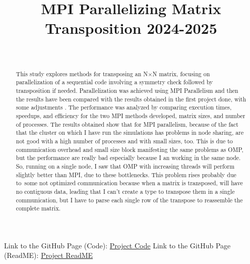 \documentclass[conference]{IEEEtran}
\begin{document}
\title{MPI Parallelizing Matrix Transposition 2024-2025}

\author{
    \\[-5.5ex]
}
\maketitle
\begin{abstract}
This study explores methods for transposing an N$\times$N matrix, focusing on parallelization of a sequential code involving a symmetry check followed by transposition if needed.
Parallelization was achieved using MPI Parallelism and then the results have been compared with the results obtained in the first project done, with some adjustments \cite{my_first_report}.
The performance was analyzed by comparing execution times, speedups, and efficiency for the two MPI methods developed, matrix sizes, and number of processes.
The results obtained show that for MPI parallelism, because of the fact that the cluster on which I have run the simulations has problems in node sharing, are not good with a high number of processes and with small sizes, too.
This is due to communication overhead and small size block manifesting the same problems as OMP, but the performance are really bad especially because I an working in the same node. So, running on a single node, I saw that OMP with increasing threads will perform slightly better than MPI, due to these bottlenecks.
This problem rises probably due to\ some not optimized communication because when a matrix is transposed, will have no contiguous data, leading that I can't create a type to transpose them in a single communication, but I have to parse each single row of the transpose to reassemble the complete matrix.
\end{abstract}


\newpage
\printbibliography 
Link to the GitHub Page (Code):
\href{https://github.com/Gotta003/Matteo_Gottardelli_Intro_PARCO_H2-2024-2025/tree/main/MPI_Matrix_Transposition}{Project Code}
\newline Link to the GitHub Page (ReadME):
\href{https://github.com/Gotta003/Matteo_Gottardelli_Intro_PARCO_H2-2024-2025/blob/main/README.md}{Project ReadME}
\end{document}
